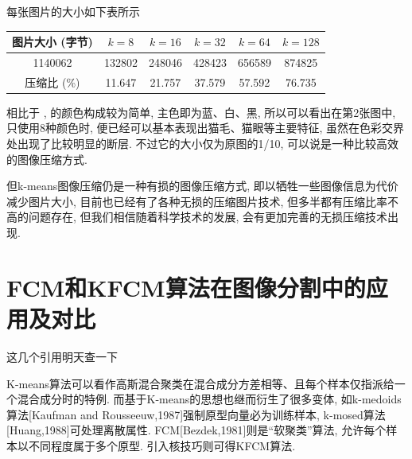 \documentclass[lang=cn,11pt]{elegantpaper}
\begin{document}
每张图片的大小如下表所示
\begin{table}[ht]
    \centering
    \begin{tabular}{c|ccccc}
    \hline
    图片大小 (字节)  & $k=8$    & $k=16$   & $k=32$   & $k=64$   & $k=128$  \\ \hline
    1140062  & 132802 & 248046 & 428423 & 656589 & 874825 \\
    压缩比 (\%) & 11.647 & 21.757 & 37.579 & 57.592 & 76.735 \\ \hline
    \end{tabular}
\end{table}

相比于 ,  的颜色构成较为简单, 主色即为蓝、白、黑, 所以可以看出在第2张图中, 只使用8种颜色时, 便已经可以基本表现出猫毛、猫眼等主要特征, 虽然在色彩交界处出现了比较明显的断层. 不过它的大小仅为原图的1/10, 可以说是一种比较高效的图像压缩方式. 









但k-means图像压缩仍是一种有损的图像压缩方式, 即以牺牲一些图像信息为代价减少图片大小, 目前也已经有了各种无损的压缩图片技术, 但多半都有压缩比率不高的问题存在, 但我们相信随着科学技术的发展, 会有更加完善的无损压缩技术出现. 










\section{FCM和KFCM算法在图像分割中的应用及对比}
\Huge 这几个引用明天查一下

\normalsize
K-means算法可以看作高斯混合聚类在混合成分方差相等、且每个样本仅指派给一个混合成分时的特例. 而基于K-means的思想也继而衍生了很多变体, 如k-medoids算法[Kaufman and Rousseeuw,1987]强制原型向量必为训练样本, k-mosed算法[Huang,1988]可处理离散属性. FCM[Bezdek,1981]则是“软聚类”算法, 允许每个样本以不同程度属于多个原型. 引入核技巧则可得KFCM算法. 
\end{document}

